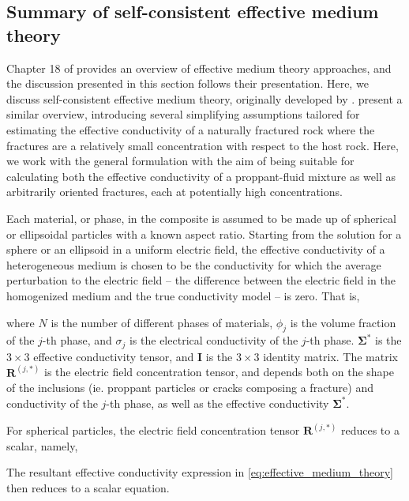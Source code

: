 



\subsection{Summary of self-consistent effective medium theory}
\label{sect:emt_math}

Chapter 18 of \cite{Torquato2002} provides an overview of effective medium theory approaches, and the discussion presented in this section follows their presentation. Here, we discuss self-consistent effective medium theory, originally developed by \cite{Bruggeman1935}. \cite{Berryman2013} present a similar overview, introducing several simplifying assumptions tailored for estimating the effective conductivity of a naturally fractured rock where the fractures are a relatively small concentration with respect to the host rock. Here, we work with the general formulation with the aim of being suitable for calculating both the effective conductivity of a proppant-fluid mixture as well as arbitrarily oriented fractures, each at potentially high concentrations.

Each material, or phase, in the composite is assumed to be made up of spherical or ellipsoidal particles with a known aspect ratio. Starting from the solution for a sphere or an ellipsoid in a uniform electric field, the effective conductivity of a heterogeneous medium is chosen to be the conductivity for which the average perturbation to the electric field -- the difference between the electric field in the homogenized medium and the true conductivity model -- is zero. That is,

where $N$ is the number of different phases of materials, $\phi_j$ is the volume fraction of the $j$-th phase, and $\sigma_j$ is the electrical conductivity of the $j$-th phase. $\boldsymbol{\Sigma^*}$ is the $3 \times 3$ effective conductivity tensor, and $\mathbf{I}$ is the $3 \times 3$ identity matrix. The matrix $\mathbf{R}^{(j,*)}$ is the electric field concentration tensor, and depends both on the shape of the inclusions (ie. proppant particles or cracks composing a fracture) and conductivity of the $j$-th phase, as well as the effective conductivity $\boldsymbol{\Sigma^*}$.

For spherical particles, the electric field concentration tensor $\mathbf{R}^{(j,*)}$ reduces to a scalar, namely,

The resultant effective conductivity expression in \ref{eq:effective_medium_theory} then reduces to a scalar equation.

